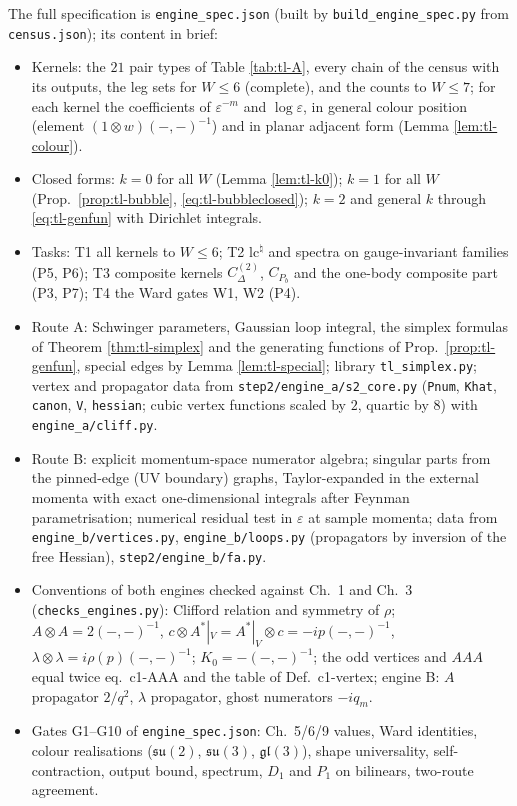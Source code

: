 \documentclass[11pt]{article}
\numberwithin{equation}{section}
\theoremstyle{plain}
\theoremstyle{definition}
\begin{document}
The full specification is \texttt{engine\_spec.json} (built by \texttt{build\_engine\_spec.py} from \texttt{census.json}); its content in brief:
\begin{itemize}
\item Kernels: the $21$ pair types of Table \ref{tab:tl-A}, every chain of the census with its outputs, the leg sets for $W\le6$ (complete), and the counts to $W\le7$; for each kernel the coefficients of $\varepsilon^{-m}$ and $\log\varepsilon$, in general colour position (element $(1\otimes w)(-,-)^{-1}$) and in planar adjacent form (Lemma \ref{lem:tl-colour}).
\item Closed forms: $k=0$ for all $W$ (Lemma \ref{lem:tl-k0}); $k=1$ for all $W$ (Prop.~\ref{prop:tl-bubble}, \eqref{eq:tl-bubbleclosed}); $k=2$ and general $k$ through \eqref{eq:tl-genfun} with Dirichlet integrals.
\item Tasks: T1 all kernels to $W\le6$; T2 $\mathrm{lc}^\natural$ and spectra on gauge-invariant families (P5, P6); T3 composite kernels $C^{(2)}_\Delta$, $C_{P_b}$ and the one-body composite part (P3, P7); T4 the Ward gates W1, W2 (P4).
\item Route A: Schwinger parameters, Gaussian loop integral, the simplex formulas of Theorem \ref{thm:tl-simplex} and the generating functions of Prop.~\ref{prop:tl-genfun}, special edges by Lemma \ref{lem:tl-special}; library \texttt{tl\_simplex.py}; vertex and propagator data from \texttt{step2/engine\_a/s2\_core.py} (\texttt{Pnum}, \texttt{Khat}, \texttt{canon}, \texttt{V}, \texttt{hessian}; cubic vertex functions scaled by $2$, quartic by $8$) with \texttt{engine\_a/cliff.py}.
\item Route B: explicit momentum-space numerator algebra; singular parts from the pinned-edge (UV boundary) graphs, Taylor-expanded in the external momenta with exact one-dimensional integrals after Feynman parametrisation; numerical residual test in $\varepsilon$ at sample momenta; data from \texttt{engine\_b/vertices.py}, \texttt{engine\_b/loops.py} (propagators by inversion of the free Hessian), \texttt{step2/engine\_b/fa.py}.
\item Conventions of both engines checked against Ch.~1 and Ch.~3 (\texttt{checks\_engines.py}): Clifford relation and symmetry of $\rho$; $A\otimes A=2(-,-)^{-1}$, $c\otimes A^*|_V=A^*|_V\otimes c=-ip(-,-)^{-1}$, $\lambda\otimes\lambda=i\rho(p)(-,-)^{-1}$; $K_0=-(-,-)^{-1}$; the odd vertices and $AAA$ equal twice eq.~c1-AAA and the table of Def.~c1-vertex; engine B: $A$ propagator $2/q^2$, $\lambda$ propagator, ghost numerators $-iq_m$.
\item Gates G1--G10 of \texttt{engine\_spec.json}: Ch.~5/6/9 values, Ward identities, colour realisations ($\mathfrak{su}(2)$, $\mathfrak{su}(3)$, $\mathfrak{gl}(3)$), shape universality, self-contraction, output bound, spectrum, $D_1$ and $P_1$ on bilinears, two-route agreement.
\end{itemize}
\end{document}

